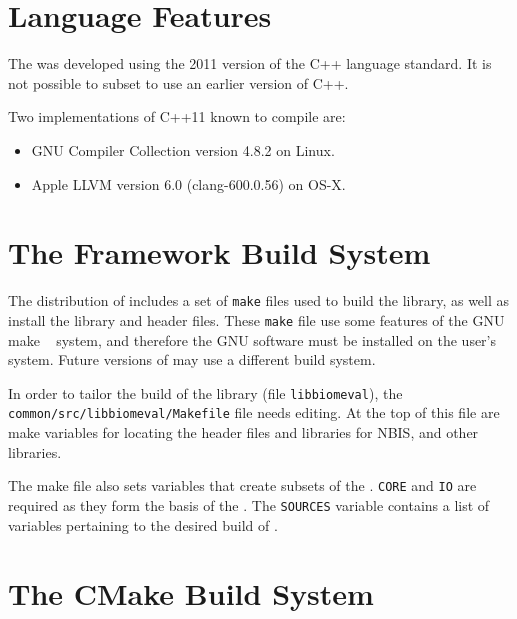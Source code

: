 %
%
\section{Language Features}

The \lname was developed using the 2011 version of the C++ language standard.
It is not possible to subset \sname to use an earlier version of C++.

Two implementations of C++11 known to compile \sname are:
\begin{itemize}
\item GNU Compiler Collection version 4.8.2 on Linux.
\item Apple LLVM version 6.0 (clang-600.0.56) on OS-X.
\end{itemize}

\section{The Framework Build System}

The distribution of \sname includes a set of \texttt{make} files used to build
the \sname library, as well as install the library and header files. These
\texttt{make} file use some features of the GNU make ~\cite{gnumake}
system, and therefore the GNU software must be installed on the user's system.
Future versions of \sname may use a different build system.

In order to tailor the build of the \sname library (file \texttt{libbiomeval}),
the \texttt{common/src/libbiomeval/Makefile} file needs editing. At the top of
this file are make variables for locating the header files and libraries for
NBIS, and other libraries.

The make file also sets variables that create subsets of the \sname.
\texttt{CORE} and \texttt{IO} are required as they form the basis of the
\sname. The \texttt{SOURCES} variable contains a list of variables pertaining
to the desired build of \sname.

\section{The CMake Build System}


